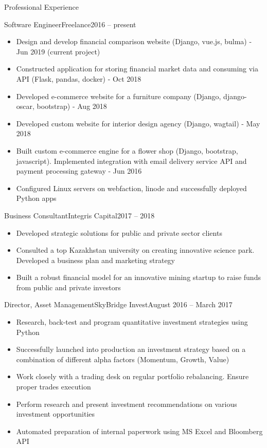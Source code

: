 \documentclass[]{mcdowellcv}
\begin{document}
\makeheader

\begin{cvsection}{Professional Experience}
  \begin{cvsubsection}{Software Engineer}{Freelance}{2016 -- present}
    \begin{itemize}
      \item Design and develop financial comparison website (Django, vue.js, bulma) - Jun 2019 (current project)
      \item Constructed application for storing financial market data and consuming via API (Flask, pandas, docker) - Oct 2018
      \item Developed e-commerce website for a furniture company (Django, django-oscar, bootstrap) - Aug 2018
      \item Developed custom website for interior design agency (Django, wagtail) - May 2018
      \item Built custom e-commerce engine for a flower shop (Django, bootstrap, javascript). Implemented integration with email delivery service API and payment processing gateway - Jun 2016
      \item Configured Linux servers on webfaction, linode and successfully deployed Python apps
    \end{itemize}
  \end{cvsubsection}

  \begin{cvsubsection}{Business Consultant}{Integris Capital}{2017 -- 2018}	
    \begin{itemize}
      \item Developed strategic solutions for public and private sector clients
      \item Consulted a top Kazakhstan university on creating innovative science park. Developed a business plan and marketing strategy
      \item Built a robust financial model for an innovative mining startup to raise funds from public and private investors
    \end{itemize}
  \end{cvsubsection}

  \begin{cvsubsection}{Director, Asset Management}{SkyBridge Invest}{August 2016 -- March 2017}		
    \begin{itemize}
      \item Research, back-test and program quantitative investment strategies using Python
      \item Successfully launched into production an investment strategy based on a combination of different alpha factors (Momentum, Growth, Value)
      \item Work closely with a trading desk on regular portfolio rebalancing. Ensure proper trades execution
      \item Perform research and present investment recommendations on various investment opportunities
      \item Automated preparation of internal paperwork using MS Excel and Bloomberg API
    \end{itemize}
  \end{cvsubsection}


\end{cvsection}
\end{document}
